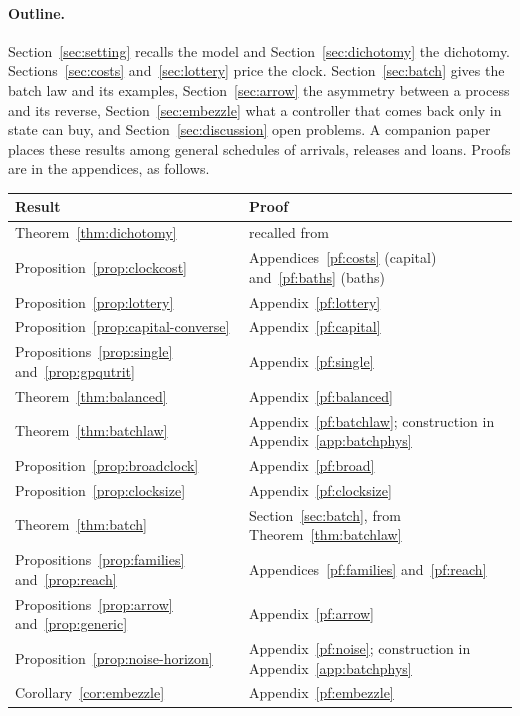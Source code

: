 \documentclass[11pt]{article}
\theoremstyle{definition}
\theoremstyle{remark}
\begin{document}
\paragraph{Outline.} Section~\ref{sec:setting} recalls the model and Section~\ref{sec:dichotomy} the dichotomy. Sections~\ref{sec:costs} and~\ref{sec:lottery} price the clock. Section~\ref{sec:batch} gives the batch law and its examples, Section~\ref{sec:arrow} the asymmetry between a process and its reverse, Section~\ref{sec:embezzle} what a controller that comes back only in state can buy, and Section~\ref{sec:discussion} open problems. A companion paper~\cite{TimeOrder} places these results among general schedules of arrivals, releases and loans. Proofs are in the appendices, as follows.
\begin{center}
\small
\begin{tabular}{ll}
\toprule
Result & Proof\\
\midrule
Theorem~\ref{thm:dichotomy} & recalled from~\cite{SaveWork}\\
Proposition~\ref{prop:clockcost} & Appendices~\ref{pf:costs} (capital) and~\ref{pf:baths} (baths)\\
Proposition~\ref{prop:lottery} & Appendix~\ref{pf:lottery}\\
Proposition~\ref{prop:capital-converse} & Appendix~\ref{pf:capital}\\
Propositions~\ref{prop:single} and~\ref{prop:gpqutrit} & Appendix~\ref{pf:single}\\
Theorem~\ref{thm:balanced} & Appendix~\ref{pf:balanced}\\
Theorem~\ref{thm:batchlaw} & Appendix~\ref{pf:batchlaw}; construction in Appendix~\ref{app:batchphys}\\
Proposition~\ref{prop:broadclock} & Appendix~\ref{pf:broad}\\
Proposition~\ref{prop:clocksize} & Appendix~\ref{pf:clocksize}\\
Theorem~\ref{thm:batch} & Section~\ref{sec:batch}, from Theorem~\ref{thm:batchlaw}\\
Propositions~\ref{prop:families} and~\ref{prop:reach} & Appendices~\ref{pf:families} and~\ref{pf:reach}\\
Propositions~\ref{prop:arrow} and~\ref{prop:generic} & Appendix~\ref{pf:arrow}\\
Proposition~\ref{prop:noise-horizon} & Appendix~\ref{pf:noise}; construction in Appendix~\ref{app:batchphys}\\
Corollary~\ref{cor:embezzle} & Appendix~\ref{pf:embezzle}\\
\bottomrule
\end{tabular}
\end{center}
\end{document}
